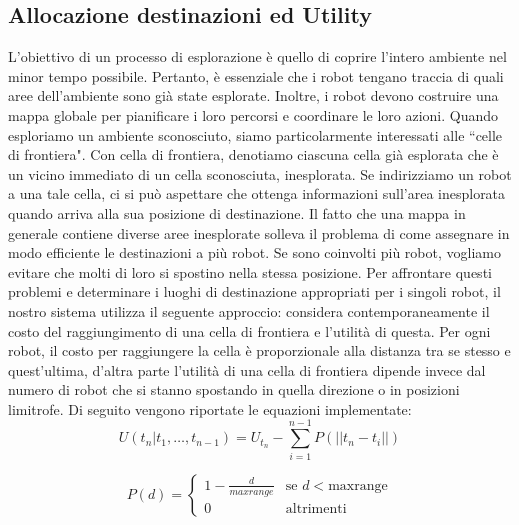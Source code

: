 \subsection{Allocazione destinazioni ed Utility}
\label{ssec:utilty}
L'obiettivo di un processo di esplorazione è quello di coprire l'intero
ambiente nel minor tempo possibile. Pertanto, è essenziale che i robot
tengano traccia di quali aree dell'ambiente sono già state esplorate.
Inoltre, i robot devono costruire una mappa globale per pianificare i loro
percorsi e coordinare le loro azioni.
Quando esploriamo un ambiente sconosciuto, siamo particolarmente
interessati alle ``celle di frontiera".
Con cella di frontiera, denotiamo ciascuna cella già esplorata che è un vicino
immediato di un cella sconosciuta, inesplorata.
Se indirizziamo un robot a una tale cella, ci si può aspettare che ottenga
informazioni sull'area inesplorata quando arriva alla sua posizione di
destinazione.
Il fatto che una mappa in generale contiene diverse aree inesplorate solleva
il problema di come assegnare in modo efficiente le destinazioni a più robot.
Se sono coinvolti più robot, vogliamo evitare che molti di loro si spostino
nella stessa posizione. Per affrontare questi problemi e determinare i luoghi
di destinazione appropriati per i singoli robot, il nostro sistema utilizza il
seguente approccio: considera contemporaneamente il costo del raggiungimento di
una cella di frontiera e l'utilità di questa.
Per ogni robot, il costo per raggiungere la cella è proporzionale alla distanza
tra se stesso e quest'ultima, d'altra parte l'utilità di una cella di frontiera
dipende invece dal numero di robot che si stanno spostando in quella direzione o
in posizioni limitrofe.\cite{burgard2005coordinated}
Di seguito vengono riportate le equazioni implementate:
\begin{equation}
\label{eq:componet1}
U(t_n|t_1,\dots,t_{n-1} ) = U_{t_n} -  \sum_{i=1}^{n-1} P(||t_n - t_i ||)
\end{equation}

\begin{equation}
\label{eq:componet2}
P(d) = \begin{cases}
   1 - \frac{d}{maxrange}  	&  	\mbox{se } d < \text{maxrange} \\
   0 									& 		\text{altrimenti}
   \end{cases}
\end{equation}

